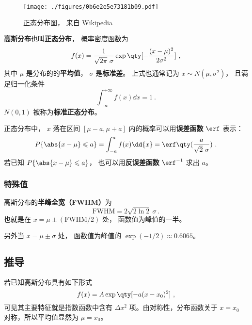 
\begin{issues}
\issueTODO
\end{issues}


\begin{figure}[ht]
\centering
\texttt{[image: ./figures/0b6e2e5e73181b09.pdf]}
\caption{正态分布图， 来自 Wikipedia} \label{fig_GausPD_1}
\end{figure}

\textbf{高斯分布}也叫\textbf{正态分布}， 概率密度函数为
\begin{equation}\label{eq_GausPD_1}
f(x) = \frac{1}{\sqrt{2\pi}\ \sigma} \exp\qty[-\frac{(x - \mu )^2}{2\sigma ^2}]~,
\end{equation}
其中 $\mu$ 是分布的的\textbf{平均值}， $\sigma$ 是\textbf{标准差}。 上式也通常记为 $x \sim N(\mu,\sigma^2)$， 且满足归一化条件
\begin{equation}\label{eq_GausPD_7}
\int_{-\infty}^{+\infty} f(x) \dd{x} = 1~.
\end{equation}
$N(0,1)$ 被称为\textbf{标准正态分布}。

正态分布中， $x$ 落在区间 $[\mu-a,\mu+a]$ 内的概率可以用\textbf{误差函数} $\erf$ 表示：
\begin{equation}
P\{\abs{x-\mu} \leqslant a\} = \int_{-a}^a f(x)\dd{x} = \erf\qty(\frac{a}{\sqrt{2}\ \sigma})~.
\end{equation}
若已知 $P\{\abs{x-\mu} \leqslant a\}$， 也可以用\textbf{反误差函数} $\erf^{-1}$ 求出 $a$。

\subsubsection{特殊值}
高斯分布的\textbf{半峰全宽（FWHM）}为
\begin{equation}
\text{FWHM} = 2\sqrt{2\ln 2}\ \sigma~.
\end{equation}
也就是在 $x = \mu \pm (\text{FWHM}/2)$ 处， 函数值为峰值的一半。

另外当 $x = \mu \pm \sigma$ 处， 函数值为峰值的 $\exp(-1/2) \approx 0.6065$。

\subsection{推导}
若已知高斯分布具有如下形式
\begin{equation}\label{eq_GausPD_2}
f(x) = A\exp\qty[-a (x - x_0)^2]~,
\end{equation}
可见其主要特征就是指数函数中含有 $\Delta x^2$ 项。由对称性，分布函数关于 $x =x_0$ 对称，所以平均值显然为 $\mu = x_0$。

